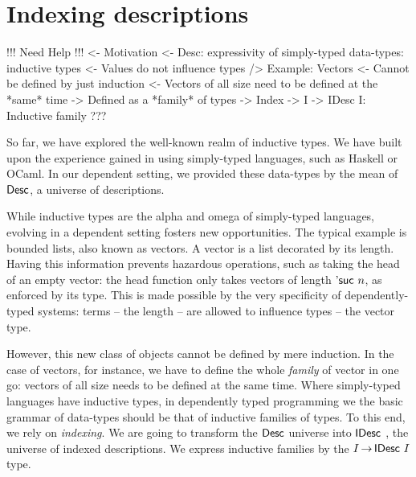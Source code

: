 \section{Indexing descriptions}
\label{sec:indexing-desc}

\begin{wstructure}
!!! Need Help !!!
<- Motivation
    <- Desc: expressivity of simply-typed data-types: inductive types
        <- Values do not influence types
    /> Example: Vectors
        <- Cannot be defined by just induction
            <- Vectors of all size need to be defined at the *same* time
            -> Defined as a *family* of types
                -> Index
        -> I -> IDesc I: Inductive family
    ???
\end{wstructure}


So far, we have explored the well-known realm of inductive types. We
have built upon the experience gained in using simply-typed languages,
such as Haskell or OCaml. In our dependent setting, we provided these
data-types by the mean of $\Desc$, a universe of descriptions. 

While inductive types are the alpha and omega of simply-typed
languages, evolving in a dependent setting fosters new
opportunities. The typical example is bounded lists, also known as
vectors. A vector is a list decorated by its length. Having this
information prevents hazardous operations, such as taking the head of
an empty vector: the head function only takes vectors of length
$\NatSuc{n}$, as enforced by its type. This is made possible by the
very specificity of dependently-typed systems: terms -- the length --
are allowed to influence types -- the vector type.

However, this new class of objects cannot be defined by mere
induction. In the case of vectors, for instance, we have to define the
whole \emph{family} of vector in one go: vectors of all size needs to
be defined at the same time. Where simply-typed languages have
inductive types, in dependently typed programming we the basic grammar of
data-types should be that of inductive families of types. To this end, we
rely on \emph{indexing}. We are going to transform the $\Desc$ universe into
$\IDesc$, the universe of indexed descriptions. We express inductive families
by the $I \To \IDesc{I}$ type.   

